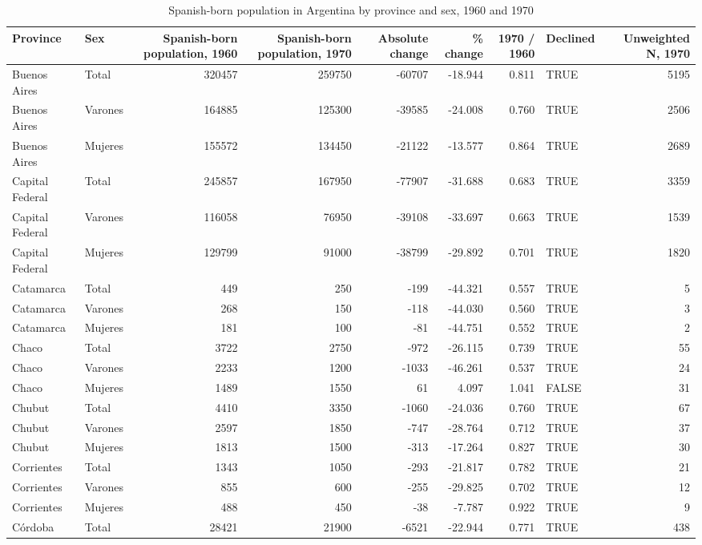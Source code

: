 \begin{table}

\caption{Spanish-born population in Argentina by province and sex, 1960 and 1970}
\centering
\begin{tabular}[t]{llrrrrrlr}
\toprule
Province & Sex & Spanish-born population, 1960 & Spanish-born population, 1970 & Absolute change & \% change & 1970 / 1960 & Declined & Unweighted N, 1970\\
\midrule
Buenos Aires & Total & 320457 & 259750 & -60707 & -18.944 & 0.811 & TRUE & 5195\\
Buenos Aires & Varones & 164885 & 125300 & -39585 & -24.008 & 0.760 & TRUE & 2506\\
Buenos Aires & Mujeres & 155572 & 134450 & -21122 & -13.577 & 0.864 & TRUE & 2689\\
Capital Federal & Total & 245857 & 167950 & -77907 & -31.688 & 0.683 & TRUE & 3359\\
Capital Federal & Varones & 116058 & 76950 & -39108 & -33.697 & 0.663 & TRUE & 1539\\
\addlinespace
Capital Federal & Mujeres & 129799 & 91000 & -38799 & -29.892 & 0.701 & TRUE & 1820\\
Catamarca & Total & 449 & 250 & -199 & -44.321 & 0.557 & TRUE & 5\\
Catamarca & Varones & 268 & 150 & -118 & -44.030 & 0.560 & TRUE & 3\\
Catamarca & Mujeres & 181 & 100 & -81 & -44.751 & 0.552 & TRUE & 2\\
Chaco & Total & 3722 & 2750 & -972 & -26.115 & 0.739 & TRUE & 55\\
\addlinespace
Chaco & Varones & 2233 & 1200 & -1033 & -46.261 & 0.537 & TRUE & 24\\
Chaco & Mujeres & 1489 & 1550 & 61 & 4.097 & 1.041 & FALSE & 31\\
Chubut & Total & 4410 & 3350 & -1060 & -24.036 & 0.760 & TRUE & 67\\
Chubut & Varones & 2597 & 1850 & -747 & -28.764 & 0.712 & TRUE & 37\\
Chubut & Mujeres & 1813 & 1500 & -313 & -17.264 & 0.827 & TRUE & 30\\
\addlinespace
Corrientes & Total & 1343 & 1050 & -293 & -21.817 & 0.782 & TRUE & 21\\
Corrientes & Varones & 855 & 600 & -255 & -29.825 & 0.702 & TRUE & 12\\
Corrientes & Mujeres & 488 & 450 & -38 & -7.787 & 0.922 & TRUE & 9\\
Córdoba & Total & 28421 & 21900 & -6521 & -22.944 & 0.771 & TRUE & 438\\

\end{tabular}
\end{table}
